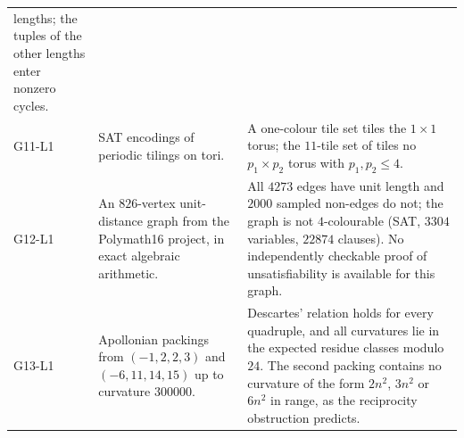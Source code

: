 {\begin{longtable}{@{}l>{\raggedright\arraybackslash}p{5.6cm}>{\raggedright\arraybackslash}p{7.6cm}@{}}
lengths; the tuples of the other lengths enter nonzero cycles. \\
G11-L1 & SAT encodings of periodic tilings on tori. & A one-colour tile set tiles the
$1 \times 1$ torus; the $11$-tile set of \citet{JeandelRao2021} tiles no $p_1 \times p_2$ torus with
$p_1, p_2 \le 4$. \\
G12-L1 & An $826$-vertex unit-distance graph from the Polymath16 project, in exact algebraic
arithmetic. & All $4273$ edges have unit length and $2000$ sampled non-edges do not; the graph is
not $4$-colourable (SAT, $3304$ variables, $22874$ clauses). No independently checkable proof of
unsatisfiability is available for this graph. \\
G13-L1 & Apollonian packings from $(-1, 2, 2, 3)$ and $(-6, 11, 14, 15)$ up to curvature
$300000$. & Descartes' relation holds for every quadruple, and all curvatures lie in the expected
residue classes modulo $24$. The second packing contains no curvature of the form $2n^2$, $3n^2$ or
$6n^2$ in range, as the reciprocity obstruction predicts. \\
\end{longtable}
}
